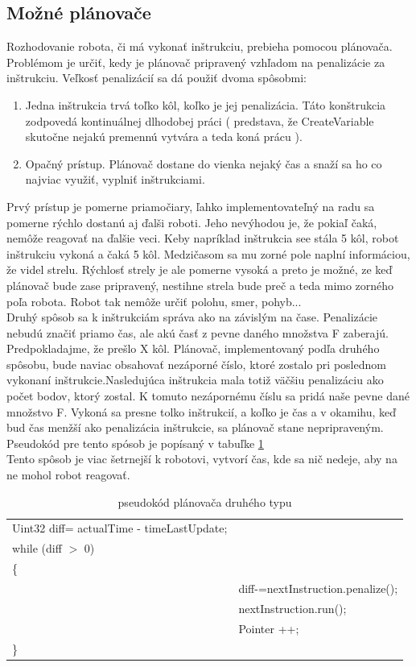 \subsection{Možné plánovače}

Rozhodovanie robota, či má vykonať inštrukciu, prebieha pomocou plánovača. Problémom je určiť, kedy je plánovač pripravený vzhľadom na penalizácie za inštrukciu. Veľkosť penalizácií sa dá použiť dvoma spôsobmi:
\begin{enumerate}
\item Jedna inštrukcia trvá toľko kôl, koľko je jej penalizácia. Táto konštrukcia zodpovedá kontinuálnej dlhodobej práci ( predstava, že CreateVariable skutočne nejakú premennú vytvára a teda koná prácu ).
\item Opačný prístup. Plánovač dostane do vienka nejaký čas a snaží sa ho co najviac využiť, vyplniť inštrukciami.
\end{enumerate}
Prvý prístup je pomerne priamočiary, ľahko implementovateľný  na radu sa pomerne rýchlo dostanú aj ďalši roboti. Jeho nevýhodou je, že pokiaľ čaká, nemôže reagovať na ďalšie veci. Keby napríklad inštrukcia see stála 5 kôl, robot inštrukciu vykoná a čaká 5 kôl. Medzičasom sa mu zorné pole naplní informáciou, že videl strelu.  Rýchlosť strely je ale pomerne vysoká a preto je možné, ze keď plánovač bude zase pripravený, nestihne strela bude preč a teda mimo zorného poľa robota. Robot tak nemôže určiť polohu, smer, pohyb...\\
Druhý spôsob sa k inštrukciám správa ako na závislým na čase. Penalizácie nebudú značiť priamo čas, ale akú časť z pevne daného množstva F zaberajú. Predpokladajme, že prešlo X kôl. Plánovač, implementovaný podľa druhého spôsobu, bude naviac obsahovať nezáporné číslo, ktoré zostalo pri poslednom vykonaní inštrukcie.Nasledujúca inštrukcia mala totiž väčšiu penalizáciu ako počet bodov, ktorý zostal. K tomuto nezápornému číslu sa pridá naše pevne dané množstvo F. Vykoná sa presne tolko inštrukcií, a koľko je čas a v okamihu, keď bud čas menžší ako penalizácia inštrukcie, sa plánovač stane nepripraveným. Pseudokód pre tento spósob je popísaný v tabuľke \ref{tab:sched2}\\
Tento spôsob je viac šetrnejší k robotovi, vytvorí čas, kde sa nič nedeje, aby na ne mohol robot reagovať.\\
\begin {table}
\centering
\begin{tabular}{|ll|}
\hline
Uint32 diff= actualTime - timeLastUpdate; &\\
while (diff $>$ 0)&\\
\{& \\ 
&diff-=nextInstruction.penalize();\\
&nextInstruction.run();\\
&Pointer ++; \\
\}&\\ 
\hline
\end{tabular}
\caption{pseudokód plánovača druhého typu}
\label{tab:sched2}
\end{table}


